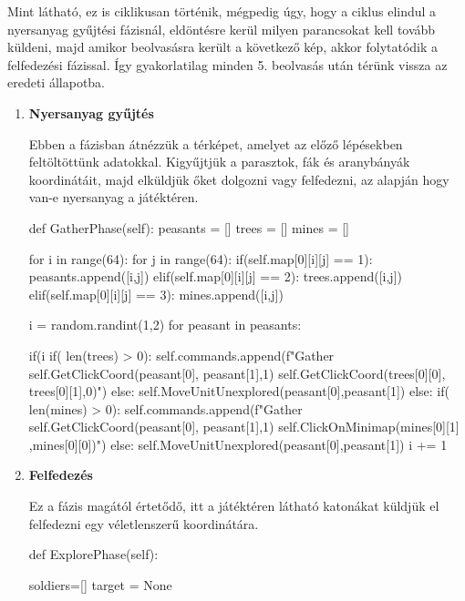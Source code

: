 \noindent Mint látható, ez is ciklikusan történik, mégpedig úgy, hogy a ciklus elindul a nyersanyag gyűjtési fázisnál, eldöntésre kerül milyen parancsokat kell tovább küldeni, majd amikor beolvasásra került a következő kép, akkor folytatódik a felfedezési fázissal. Így gyakorlatilag minden 5. beolvasás után térünk vissza az eredeti állapotba.
\begin{enumerate}
    \item \textbf{Nyersanyag gyűjtés}

    Ebben a fázisban átnézzük a térképet, amelyet az előző lépésekben feltöltöttünk adatokkal. Kigyűjtjük a parasztok, fák és aranybányák koordinátáit, majd elküldjük őket dolgozni vagy felfedezni, az alapján hogy van-e nyersanyag a játéktéren.

    \begin{python}
def GatherPhase(self):
    peasants = []
    trees = []
    mines = []

    for i in range(64):
        for j in range(64):
            if(self.map[0][i][j] == 1):
                peasants.append([i,j])
            elif(self.map[0][i][j] == 2):
                trees.append([i,j])
            elif(self.map[0][i][j] == 3):
                mines.append([i,j])

    i = random.randint(1,2)
    for peasant in peasants:
            
        if(i %
            if( len(trees) > 0):
                self.commands.append(f"Gather 
                {self.GetClickCoord(peasant[0],
                peasant[1],1)} { self.GetClickCoord(trees[0][0],
                trees[0][1],0)}")
            else:
                self.MoveUnitUnexplored(peasant[0],peasant[1])
        else:
            if( len(mines) > 0):
                self.commands.append(f"Gather 
                {self.GetClickCoord(peasant[0],
                peasant[1],1)} { self.ClickOnMinimap(mines[0][1]
                ,mines[0][0])}")
            else:
                self.MoveUnitUnexplored(peasant[0],peasant[1])
        i += 1
\end{python}

\item \textbf{Felfedezés}

Ez a fázis magától értetődő, itt a játéktéren látható katonákat küldjük el felfedezni egy véletlenszerű koordinátára.
 \begin{python}
def ExplorePhase(self):

    soldiers=[]
    target = None
        

\end{python}
\end{enumerate}
